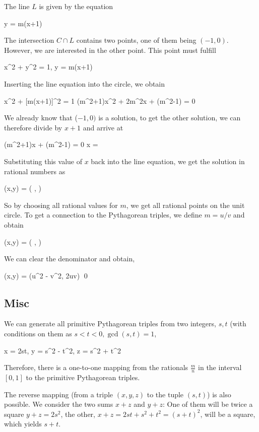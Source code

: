The line $L$ is given by the equation

\bee
y = m(x+1)
\eee

The intersection $C \cap L$ contains two points, one of them being $(-1,0)$. However, we are interested in the other point. This point must fulfill

\bee
x^2 + y^2 = 1, \quad y = m(x+1)
\eee

Inserting the line equation into the circle, we obtain

\bee
x^2 + [m(x+1)]^2 = 1 \rightarrow (m^2+1)x^2 + 2m^2x + (m^2-1) = 0
\eee

We already know that ($-1,0)$ is a solution, to get the other solution, we can therefore divide by $x+1$ and arrive at

\bee
(m^2+1)x + (m^2-1) = 0 \rightarrow x = 
\eee

Substituting this value of $x$ back into the line equation, we get the solution in rational numbers as

\bee
(x,y) = \left( ,  \right)
\eee

So by choosing all rational values for $m$, we get all rational points on the unit circle. To get a connection to the Pythagorean triples, we define $m = u/v$ and obtain

\bee
(x,y) = \left( ,  \right)
\eee

We can clear the denominator and obtain,

\bee
(x,y) = (u^2 - v^2, 2uv) \qed
\eee

\subsection{Misc}

We can generate all primitive Pythagorean triples from two integers, $s, t$ (with conditions on them as $s < t < 0, \gcd(s,t)=1$,

\bee
x = 2st, \quad y = s^2 - t^2, \quad z = s^2 + t^2
\eee

Therefore, there is a one-to-one mapping from the rationals $\frac{m}{n}$ in the interval $[0,1]$ to the primitive Pythagorean triples.

The reverse mapping (from a triple $(x,y,z)$ to the tuple $(s,t)$) is also possible. We consider the two sums $x+z$ and $y+z$: One of them will be twice a square $y + z = 2s^2$, the other, $x + z = 2st + s^2 + t^2 = (s+t)^2$, will be a square, which yields $s+t$.

